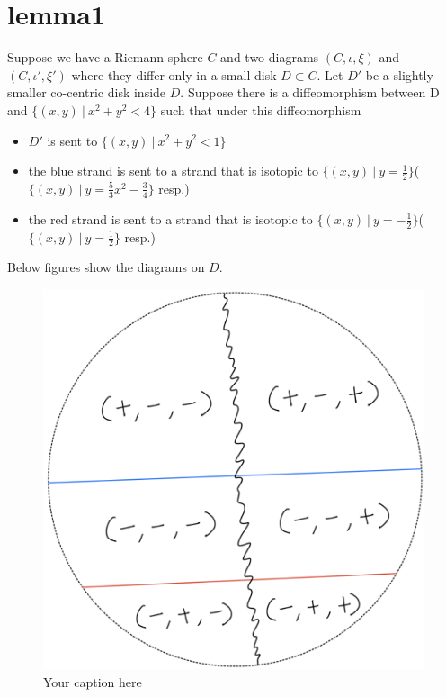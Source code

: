 \section{lemma1}
Suppose we have a Riemann sphere $C$ and two diagrams $(C,\iota,\xi)$ and $(C,\iota',\xi')$ where they differ only in a small disk $D\subset C$. Let $D'$ be a slightly smaller co-centric disk inside $D$. Suppose there is a diffeomorphism between D and $\{(x,y)~|~x^2+y^2 < 4\}$ such that under this diffeomorphism 
\begin{itemize}
\item $D'$ is sent to $\{(x,y)~|~x^2+y^2 < 1\}$
\item the blue strand is sent to a strand that is isotopic to $\{(x,y)~|~y=\frac{1}{2}\}$($\{(x,y)~|~y = \frac{5}{3}x^2 - \frac{3}{4}\}$ resp.)
\item the red strand is sent to a strand that is isotopic to $\{(x,y)~|~y=-\frac{1}{2}\}$($\{(x,y)~|~y=\frac{1}{2}\}$ resp.)
\end{itemize}
Below figures show the diagrams on $D$.


\begin{figure}[H] %
    \centering
    \includegraphics[scale = 0.95]{diagrams/lemma1/1.png} %
    \caption{Your caption here}
    \label{fig:your-label}
\end{figure}


